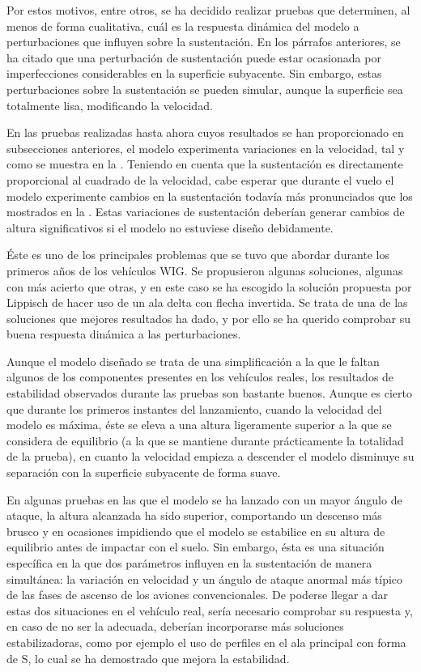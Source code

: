 Por estos motivos, entre otros, se ha decidido realizar pruebas que determinen, al menos de forma cualitativa, cuál es la respuesta dinámica del modelo a perturbaciones que influyen sobre la sustentación. En los párrafos anteriores, se ha citado que una perturbación de sustentación puede estar ocasionada por imperfecciones considerables en la superficie subyacente. Sin embargo, estas perturbaciones sobre la sustentación se pueden simular, aunque la superficie sea totalmente lisa, modificando la velocidad.

En las pruebas realizadas hasta ahora cuyos resultados se han proporcionado en subsecciones anteriores, el modelo experimenta variaciones en la velocidad, tal y como se muestra en la . Teniendo en cuenta que la sustentación es directamente proporcional al cuadrado de la velocidad, cabe esperar que durante el vuelo el modelo experimente cambios en la sustentación todavía más pronunciados que los mostrados en la . Estas variaciones de sustentación deberían generar cambios de altura significativos si el modelo no estuviese diseño debidamente.

Éste es uno de los principales problemas que se tuvo que abordar durante los primeros años de los vehículos WIG. Se propusieron algunas soluciones, algunas con más acierto que otras, y en este caso se ha escogido la solución propuesta por Lippisch de hacer uso de un ala delta con flecha invertida. Se trata de una de las soluciones que mejores resultados ha dado, y por ello se ha querido comprobar su buena respuesta dinámica a las perturbaciones.

Aunque el modelo diseñado se trata de una simplificación a la que le faltan algunos de los componentes presentes en los vehículos reales, los resultados de estabilidad observados durante las pruebas son bastante buenos. Aunque es cierto que durante los primeros instantes del lanzamiento, cuando la velocidad del modelo es máxima, éste se eleva a una altura ligeramente superior a la que se considera de equilibrio (a la que se mantiene durante prácticamente la totalidad de la prueba), en cuanto la velocidad empieza a descender el modelo disminuye su separación con la superficie subyacente de forma suave.

En algunas pruebas en las que el modelo se ha lanzado con un mayor ángulo de ataque, la altura alcanzada ha sido superior, comportando un descenso más brusco y en ocasiones impidiendo que el modelo se estabilice en su altura de equilibrio antes de impactar con el suelo. Sin embargo, ésta es una situación específica en la que dos parámetros influyen en la sustentación de manera simultánea: la variación en velocidad y un ángulo de ataque anormal más típico de las fases de ascenso de los aviones convencionales. De poderse llegar a dar estas dos situaciones en el vehículo real, sería necesario comprobar su respuesta y, en caso de no ser la adecuada, deberían incorporarse más soluciones estabilizadoras, como por ejemplo el uso de perfiles en el ala principal con forma de S, lo cual se ha demostrado que mejora la estabilidad.\cite{ref:Sshaped}


